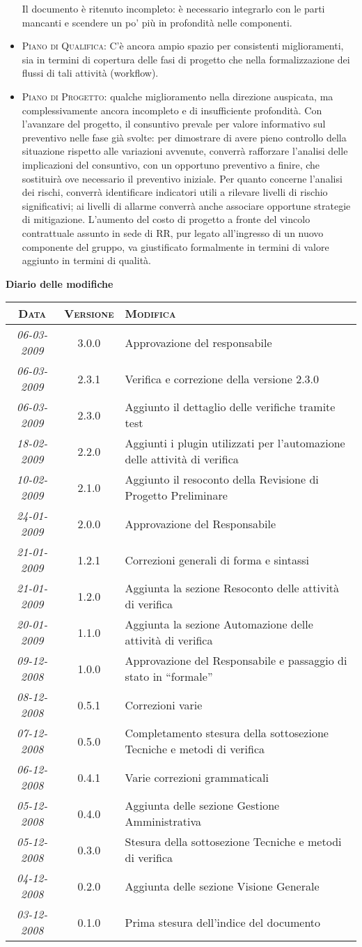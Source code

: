\documentclass[11pt,a4paper]{article}
\newcommand{\modifiche} 
{
\newpage
\begin{center}
\textbf{Diario delle modifiche} \\
\bigskip
\begin{tabular}{|c|c|p{0.61\textwidth}|}
\hline
\textsc{Data} & \textsc{Versione} & \textsc{Modifica} \\
\hline
\hline
\textit{06-03-2009} & 3.0.0 & Approvazione del responsabile  \\
\hline
\textit{06-03-2009} & 2.3.1 & Verifica e correzione della versione 2.3.0  \\
\hline
\textit{06-03-2009} & 2.3.0 & Aggiunto il dettaglio delle verifiche tramite test   \\
\hline
\textit{18-02-2009} & 2.2.0 & Aggiunti i plugin utilizzati per l'automazione delle attività di verifica  \\
\hline
\textit{10-02-2009} & 2.1.0 & Aggiunto il resoconto della Revisione di Progetto Preliminare  \\
\hline
\textit{24-01-2009} & 2.0.0 & Approvazione del Responsabile  \\
\hline
\textit{21-01-2009} & 1.2.1 & Correzioni generali di forma e sintassi  \\
\hline
\textit{21-01-2009} & 1.2.0 & Aggiunta la sezione Resoconto delle attività di verifica  \\
\hline
\textit{20-01-2009} & 1.1.0 & Aggiunta la sezione Automazione delle attività di verifica  \\
\hline
\textit{09-12-2008} & 1.0.0 & Approvazione del Responsabile e passaggio di stato in ``formale''  \\
\hline
\textit{08-12-2008} & 0.5.1 & Correzioni varie  \\
\hline
\textit{07-12-2008} & 0.5.0 & Completamento stesura della sottosezione Tecniche e metodi di verifica  \\
\hline
\textit{06-12-2008} & 0.4.1 & Varie correzioni grammaticali  \\
\hline
\textit{05-12-2008} & 0.4.0 & Aggiunta delle sezione Gestione Amministrativa  \\
\hline
\textit{05-12-2008} & 0.3.0 & Stesura della sottosezione Tecniche e metodi di verifica  \\
\hline
\textit{04-12-2008} & 0.2.0 & Aggiunta delle sezione Visione Generale  \\
\hline
\textit{03-12-2008} & 0.1.0 & Prima stesura dell'indice del documento \\
\hline
\end{tabular}
\end{center}
}
\begin{document}
\begin{itemize}
Il documento è ritenuto incompleto: è necessario integrarlo con le parti mancanti e scendere un po' più in profondità nelle componenti.
\item \textsc{Piano di Qualifica:} C'è ancora ampio spazio per consistenti miglioramenti, sia in termini di copertura delle fasi di progetto che nella formalizzazione dei flussi di tali attività (workflow).
\item \textsc{Piano di Progetto:} qualche miglioramento nella direzione auspicata, ma complessivamente ancora incompleto e di insufficiente profondità.
Con l'avanzare del progetto, il consuntivo prevale per valore informativo sul preventivo nelle fase già svolte: per dimostrare di avere pieno controllo della situazione rispetto alle variazioni avvenute, converrà rafforzare l'analisi delle implicazioni del consuntivo, con un opportuno preventivo a finire, che sostituirà ove necessario il preventivo iniziale.
Per quanto concerne l'analisi dei rischi, converrà identificare indicatori utili a rilevare livelli di rischio significativi; ai livelli di allarme converrà anche associare opportune strategie di mitigazione.
L'aumento del costo di progetto a fronte del vincolo contrattuale assunto in sede di RR, pur legato all'ingresso di un nuovo componente del gruppo, va giustificato formalmente in termini di valore aggiunto in termini di qualità.
\end{itemize}
\modifiche
\end{document}
